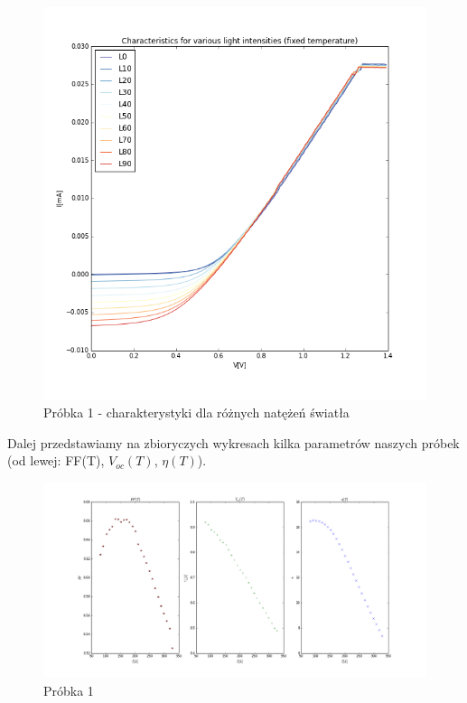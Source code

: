 \documentclass[a4paper,12pt]{article}
\begin{document}
\begin{figure} [H]
  \begin{center}
    \includegraphics[width = 15cm]{probka2_swiatlo.png}
    \caption{Próbka 1 - charakterystyki dla różnych natężeń światła}
  \end{center}
\end{figure}

Dalej przedstawiamy na zbioryczych wykresach kilka parametrów naszych próbek (od lewej: FF(T), $V_{oc}(T) $, $\eta (T) $).

\begin{figure} [H]
  \begin{center}
    \includegraphics[width = 15cm]{probka1_rozne.png}
    \caption{Próbka 1}
  \end{center}
\end{figure}
\end{document}
